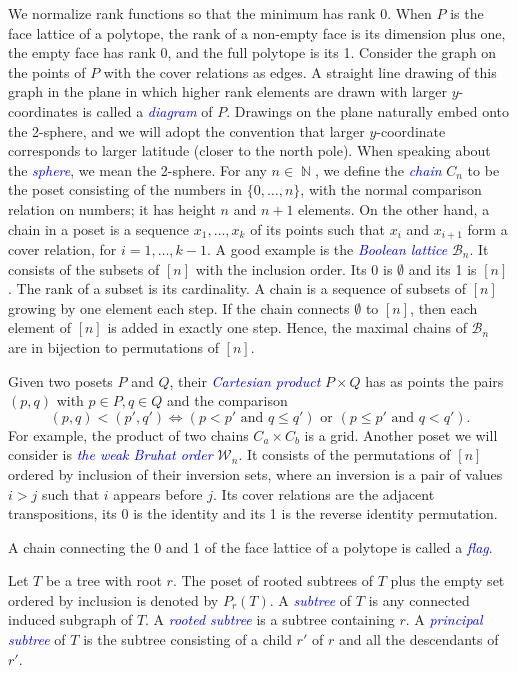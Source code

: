 \documentclass[fontsize=11pt,a4paper,DIV=12]{scrartcl}
\newcommand{\defn}[1]{\textsl{\textcolor{Blue}{#1}}}
\DeclareMathOperator{\N}{\mathbb{N}}
\begin{document}
We normalize rank functions so that the minimum has rank 0. When $P$ is the face lattice of a polytope, the rank of a non-empty face is its dimension plus one, the empty face has rank 0, and the full polytope is its 1.
Consider the graph on the points of $P$ with the cover relations as edges. A straight line drawing of this graph in the plane in which higher rank elements are drawn with larger $y$-coordinates is called a \defn{diagram} of $P$. Drawings on the plane naturally embed onto the 2-sphere, and we will adopt the convention that larger $y$-coordinate corresponds to larger latitude (closer to the north pole). When speaking about the \defn{sphere}, we mean the 2-sphere. For any $n\in\N$, we define the \defn{chain} $C_n$ to be the poset consisting of the numbers in $\{0,\ldots, n\}$, with the normal comparison relation on numbers; it has height $n$ and $n+1$ elements. On the other hand, a chain in a poset is a sequence $x_1,\ldots,x_k$ of its points such that $x_i$ and $x_{i+1}$ form a cover relation, for $i=1,\ldots,k-1$. A good example is the \defn{Boolean lattice} $\mathcal B_n$. It consists of the subsets of $[n]$ with the inclusion order. Its 0 is $\emptyset$ and its 1 is $[n]$. The rank of a subset is its cardinality. A chain is a sequence of subsets of $[n]$ growing by one element each step. If the chain connects $\emptyset$ to $[n]$, then each element of $[n]$ is added in exactly one step. Hence, the maximal chains of $\mathcal B_n$ are in bijection to permutations of $[n]$.

Given two posets $P$ and $Q$, their \defn{Cartesian product} $P\times Q$ has as points the pairs $(p,q)$ with $p\in P,q\in Q$ and the comparison
\[
	(p,q)<(p',q')\iff (p<p'\text{ and }q\le q') \text{ or } (p\le p'\text{ and }q< q').
\]
For example, the product of two chains $C_a\times C_b$ is a grid. Another poset we will consider is \defn{the weak Bruhat order} $\mathcal{W}_n$. It consists of the permutations of $[n]$ ordered by inclusion of their inversion sets, where an inversion is a pair of values $i>j$ such that $i$ appears before $j$. Its cover relations are the adjacent transpositions, its 0 is the identity and its 1 is the reverse identity permutation.

A chain connecting the 0 and 1 of the face lattice of a polytope is called a \defn{flag}.

Let $T$ be a tree with root $r$. The poset of rooted subtrees of $T$ plus the empty set ordered by inclusion is denoted by $P_r(T)$. A \defn{subtree} of $T$ is any connected induced subgraph of $T$. A \defn{rooted subtree} is a subtree containing $r$. A \defn{principal subtree} of $T$ is the subtree consisting of a child $r'$ of $r$ and all the descendants of $r'$.
\end{document}

